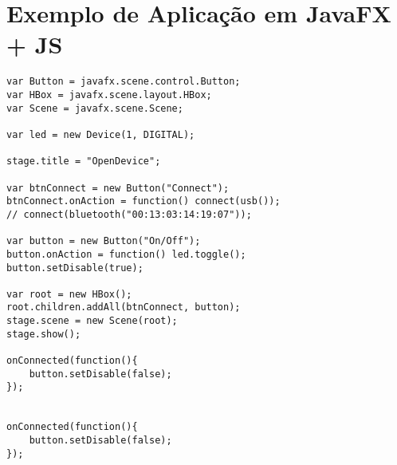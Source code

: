 
\chapter{Exemplo de Aplicação em JavaFX + JS\label{chap:ApendiceA}}

\begin{lstlisting}[language=VBScript]
var Button = javafx.scene.control.Button;
var HBox = javafx.scene.layout.HBox;
var Scene = javafx.scene.Scene;

var led = new Device(1, DIGITAL);

stage.title = "OpenDevice";

var btnConnect = new Button("Connect");
btnConnect.onAction = function() connect(usb());
// connect(bluetooth("00:13:03:14:19:07"));

var button = new Button("On/Off");
button.onAction = function() led.toggle();
button.setDisable(true);

var root = new HBox();
root.children.addAll(btnConnect, button);
stage.scene = new Scene(root);
stage.show();

onConnected(function(){
    button.setDisable(false);
});


onConnected(function(){
    button.setDisable(false);
});
\end{lstlisting}
